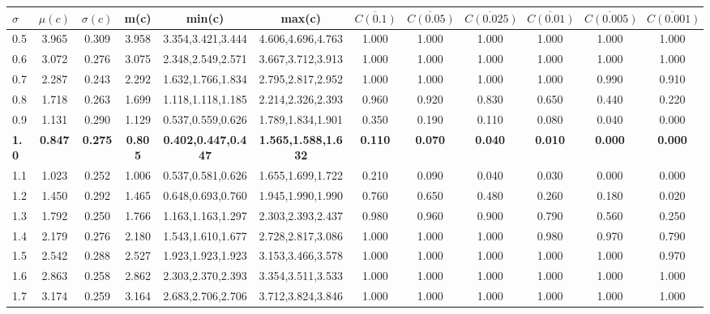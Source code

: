 \begin{table*}[h!]
\begin{center}
\begin{tabular}{| l | c | c | c | c | c | c | c | c | c | c | c |}\hline
$\sigma$ & $\mu(c)$ & $\sigma(c)$ & m(c) & min(c) & max(c) & $\overline{C(0.1)}$ & $\overline{C(0.05)}$ & $\overline{C(0.025)}$ & $\overline{C(0.01)}$ & $\overline{C(0.005)}$ & $\overline{C(0.001)}$ \\\hline\hline
0.5 & 3.965 & 0.309 & 3.958 & 3.354,3.421,3.444 & 4.606,4.696,4.763  & 1.000  & 1.000  & 1.000  & 1.000  & 1.000  & 1.000 \\\hline
0.6 & 3.072 & 0.276 & 3.075 & 2.348,2.549,2.571 & 3.667,3.712,3.913  & 1.000  & 1.000  & 1.000  & 1.000  & 1.000  & 1.000 \\\hline
0.7 & 2.287 & 0.243 & 2.292 & 1.632,1.766,1.834 & 2.795,2.817,2.952  & 1.000  & 1.000  & 1.000  & 1.000  & 0.990  & 0.910 \\\hline
0.8 & 1.718 & 0.263 & 1.699 & 1.118,1.118,1.185 & 2.214,2.326,2.393  & 0.960  & 0.920  & 0.830  & 0.650  & 0.440  & 0.220 \\\hline
0.9 & 1.131 & 0.290 & 1.129 & 0.537,0.559,0.626 & 1.789,1.834,1.901  & 0.350  & 0.190  & 0.110  & 0.080  & 0.040  & 0.000 \\\hline
{\bf 1.0} & {\bf 0.847} & {\bf 0.275} & {\bf 0.805} & {\bf 0.402,0.447,0.447} & {\bf 1.565,1.588,1.632} & {\bf 0.110} & {\bf 0.070} & {\bf 0.040} & {\bf 0.010} & {\bf 0.000} & {\bf 0.000} \\\hline
1.1 & 1.023 & 0.252 & 1.006 & 0.537,0.581,0.626 & 1.655,1.699,1.722  & 0.210  & 0.090  & 0.040  & 0.030  & 0.000  & 0.000 \\\hline
1.2 & 1.450 & 0.292 & 1.465 & 0.648,0.693,0.760 & 1.945,1.990,1.990  & 0.760  & 0.650  & 0.480  & 0.260  & 0.180  & 0.020 \\\hline
1.3 & 1.792 & 0.250 & 1.766 & 1.163,1.163,1.297 & 2.303,2.393,2.437  & 0.980  & 0.960  & 0.900  & 0.790  & 0.560  & 0.250 \\\hline
1.4 & 2.179 & 0.276 & 2.180 & 1.543,1.610,1.677 & 2.728,2.817,3.086  & 1.000  & 1.000  & 1.000  & 0.980  & 0.970  & 0.790 \\\hline
1.5 & 2.542 & 0.288 & 2.527 & 1.923,1.923,1.923 & 3.153,3.466,3.578  & 1.000  & 1.000  & 1.000  & 1.000  & 1.000  & 0.970 \\\hline
1.6 & 2.863 & 0.258 & 2.862 & 2.303,2.370,2.393 & 3.354,3.511,3.533  & 1.000  & 1.000  & 1.000  & 1.000  & 1.000  & 1.000 \\\hline
1.7 & 3.174 & 0.259 & 3.164 & 2.683,2.706,2.706 & 3.712,3.824,3.846  & 1.000  & 1.000  & 1.000  & 1.000  & 1.000  & 1.000 \\\hline

\end{tabular}
\end{center}
\end{table*}

